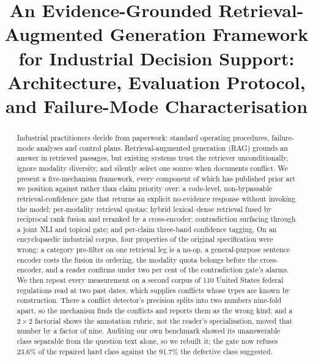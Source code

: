\documentclass[conference]{IEEEtran}
\begin{document}
\title{An Evidence-Grounded Retrieval-Augmented Generation
Framework for Industrial Decision Support:
Architecture, Evaluation Protocol, and Failure-Mode Characterisation}

\author{
\and
{}
}

\maketitle

\begin{abstract}
Industrial practitioners decide from paperwork: standard operating
procedures, failure-mode analyses and control plans. Retrieval-augmented
generation (RAG) grounds an answer in retrieved passages, but existing systems
trust the retriever unconditionally, ignore modality diversity, and silently
select one source when documents conflict. We present a five-mechanism
framework, every component of which has published prior art we position
against rather than claim priority over: a code-level, non-bypassable
retrieval-confidence gate that returns an explicit no-evidence response
without invoking the model; per-modality retrieval quotas; hybrid
lexical--dense retrieval fused by reciprocal rank fusion and reranked by a
cross-encoder; contradiction surfacing through a joint NLI and topical gate;
and per-claim three-band confidence tagging. On an encyclopaedic industrial
corpus, four properties of the original specification were wrong: a category
pre-filter on one retrieval leg is a no-op, a general-purpose sentence encoder
costs the fusion its ordering, the modality quota belongs before the
cross-encoder, and a reader confirms under two per cent of the contradiction
gate's alarms. We then repeat every measurement on a second corpus of 110
United States federal regulations read at two past dates, which supplies
conflicts whose types are known by construction. There a conflict detector's
precision splits into two numbers nine-fold apart, so the mechanism finds the
conflicts and reports them as the wrong kind; and a $2\times2$ factorial shows
the annotation rubric, not the reader's specialisation, moved that number by a
factor of nine. Auditing our own benchmark showed its unanswerable class
separable from the question text alone, so we rebuilt it; the gate now refuses
23.6\% of the repaired hard class against the
91.7\% the defective class suggested.
\end{abstract}
\end{document}
